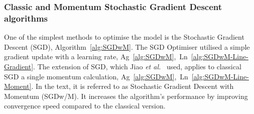 %
\subsubsection{Classic and Momentum Stochastic Gradient Descent algorithms}
One of the simplest methods to optimise the model is the Stochastic Gradient Descent (SGD), Algorithm~\ref{alg:SGDwM}. %
The SGD Optimiser utilised a simple gradient update with a learning rate, \mbox{Ag~\ref{alg:SGDwM}, Ln~\ref{alg:SGDwM-Line-Gradient}}.
The extension of SGD, which Jiao \textit{et al.}~\cite{jiao_gru-rnn_2020} used, applies to classical SGD a single momentum calculation, \mbox{Ag~\ref{alg:SGDwM}, Ln~\ref{alg:SGDwM-Line-Moment}}.
In the text, it is referred to as Stochastic Gradient Descent with Momentum (SGDw/M).
It increases the algorithm's performance by improving convergence speed compared to the classical version.
